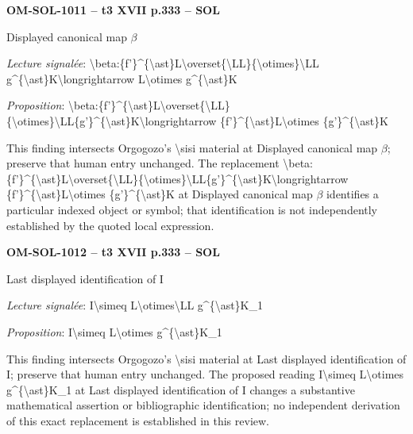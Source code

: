 \par\noindent\textbf{OM-SOL-1011 -- t3 XVII p.333 -- SOL}\par
Displayed canonical map \ensuremath{\beta}\par
\emph{Lecture signalée}: \textbackslash{}beta:\{f'\}\textasciicircum{}\{\textbackslash{}ast\}L\textbackslash{}overset\{\textbackslash{}LL\}\{\textbackslash{}otimes\}\textbackslash{}LL g\textasciicircum{}\{\textbackslash{}ast\}K\textbackslash{}longrightarrow L\textbackslash{}otimes g\textasciicircum{}\{\textbackslash{}ast\}K\par
\emph{Proposition}: \textbackslash{}beta:\{f'\}\textasciicircum{}\{\textbackslash{}ast\}L\textbackslash{}overset\{\textbackslash{}LL\}\{\textbackslash{}otimes\}\textbackslash{}LL\{g'\}\textasciicircum{}\{\textbackslash{}ast\}K\textbackslash{}longrightarrow \{f'\}\textasciicircum{}\{\textbackslash{}ast\}L\textbackslash{}otimes \{g'\}\textasciicircum{}\{\textbackslash{}ast\}K\par
This finding intersects Orgogozo's \textbackslash{}sisi material at Displayed canonical map \ensuremath{\beta}; preserve that human entry unchanged. The replacement \textbackslash{}beta:\{f'\}\textasciicircum{}\{\textbackslash{}ast\}L\textbackslash{}overset\{\textbackslash{}LL\}\{\textbackslash{}otimes\}\textbackslash{}LL\{g'\}\textasciicircum{}\{\textbackslash{}ast\}K\textbackslash{}longrightarrow \{f'\}\textasciicircum{}\{\textbackslash{}ast\}L\textbackslash{}otimes \{g'\}\textasciicircum{}\{\textbackslash{}ast\}K at Displayed canonical map \ensuremath{\beta} identifies a particular indexed object or symbol; that identification is not independently established by the quoted local expression.\par
\par\noindent\textbf{OM-SOL-1012 -- t3 XVII p.333 -- SOL}\par
Last displayed identification of I\par
\emph{Lecture signalée}: I\textbackslash{}simeq L\textbackslash{}otimes\textbackslash{}LL g\textasciicircum{}\{\textbackslash{}ast\}K\_1\par
\emph{Proposition}: I\textbackslash{}simeq L\textbackslash{}otimes g\textasciicircum{}\{\textbackslash{}ast\}K\_1\par
This finding intersects Orgogozo's \textbackslash{}sisi material at Last displayed identification of I; preserve that human entry unchanged. The proposed reading I\textbackslash{}simeq L\textbackslash{}otimes g\textasciicircum{}\{\textbackslash{}ast\}K\_1 at Last displayed identification of I changes a substantive mathematical assertion or bibliographic identification; no independent derivation of this exact replacement is established in this review.\par
